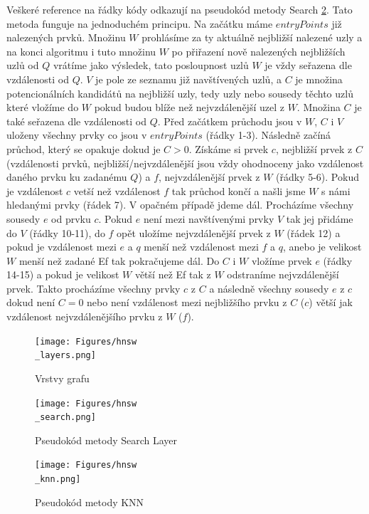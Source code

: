 \documentclass[czech,semestral,dept460,male,csharp,cpdeclaration]{diploma}
\begin{document}
		Veškeré reference na řádky kódy odkazují na pseudokód metody Search \ref{hnsw_search}. Tato metoda funguje na jednoduchém principu. Na začátku máme $entryPoints$ již nalezených prvků. Množinu $W$ prohlásíme za ty aktuálně nejbližší nalezené uzly a na konci algoritmu i tuto množinu $W$ po přiřazení nově nalezených nejbližších uzlů od $Q$ vrátíme jako výsledek, tato posloupnost uzlů $W$ je vždy seřazena dle vzdálenosti od $Q$. $V$ je pole ze seznamu již navštívených uzlů, a $C$ je množina potencionálních kandidátů na nejbližší uzly, tedy uzly nebo sousedy těchto uzlů které vložíme do $W$ pokud budou blíže než nejvzdálenější uzel z $W$. Množina $C$ je také seřazena dle vzdálenosti od $Q$. Před začátkem průchodu jsou v $W$, $C$ i $V$ uloženy všechny prvky co jsou v $entryPoints$ (řádky 1-3). Následně začíná průchod, který se opakuje dokud je $C > 0$. Získáme si prvek $c$, nejbližší prvek z $C$ (vzdálenosti prvků, nejbližší/nejvzdálenější jsou vždy ohodnoceny jako vzdálenost daného prvku ku zadanému $Q$) a $f$, nejvzdálenější prvek z $W$ (řádky 5-6). Pokud je vzdálenost $c$ vetší než vzdálenost $f$ tak průchod končí a našli jsme $W$ s námi hledanými prvky (řádek 7). V opačném případě jdeme dál. Procházíme všechny sousedy $e$ od prvku $c$. Pokud $e$ není mezi navštívenými prvky $V$ tak jej přidáme do $V$ (řádky 10-11), do $f$ opět uložíme nejvzdálenější prvek z $W$ (řádek 12) a pokud je vzdálenost mezi $e$ a $q$ menší než vzdálenost mezi $f$ a $q$, anebo je velikost $W$ menší než zadané Ef tak pokračujeme dál. Do $C$ i $W$ vložíme prvek $e$ (řádky 14-15) a pokud je velikost $W$ větší než Ef tak z $W$ odstraníme nejvzdálenější prvek. Takto procházíme všechny prvky $c$ z $C$ a následně všechny sousedy $e$ z $c$ dokud není $C = 0$ nebo není vzdálenost mezi nejbližšího prvku z $C$ ($c$) větší jak vzdálenost nejvzdálenějšího prvku z $W$ ($f$).
		
		\begin{figure}
			\centering
			\texttt{[image: Figures/hnsw\\\_layers.png]}
			\caption{Vrstvy grafu}
			\label{hnsw_layers}
		\end{figure}
		
		\begin{figure}
			\centering
			\texttt{[image: Figures/hnsw\\\_search.png]}
			\caption{Pseudokód metody Search Layer}
			\label{hnsw_search}
		\end{figure}
		
		\begin{figure}
			\centering
			\texttt{[image: Figures/hnsw\\\_knn.png]}
			\caption{Pseudokód metody KNN}
			\label{hnsw_knn}
		\end{figure}
		
\end{document}
